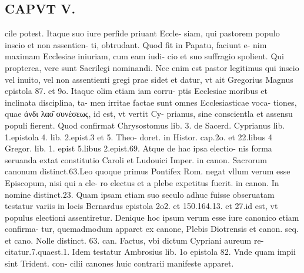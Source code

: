 \documentclass{article}
\begin{document}
\begin{pages}
\section*{CAPVT  V. }
\marginpar{[ p.35  ]}\pstart cile potest. Itaque suo iure perfide priuant Eccle- siam, qui pastorem populo inscio et non assentien- ti, obtrudant. Quod fit in Papatu, faciunt e- nim maximam Ecclesiae iniuriam, cum eam iudi- cio et suo suffragio spolient. Qui propterea, vere sunt Sacrilegi nominandi. Nec enim est pastor legitimus qui inscio vel inuito, vel non assentienti gregi prae sidet et datur, vt ait Gregorius Magnus epistola 87. et 9o. Itaque olim etiam iam corru- ptis Ecclesiae moribus et inclinata disciplina, ta- men irritae factae sunt omnes Ecclesiasticae voca- tiones, quae ἀνδι λαο͂ συνέσεως, id est, vt vertit Cy- prianus, sine conscientla et assensu populi fierent. Quod confirmat Chrysostomus lib. 3. de Sacerd. Cyprianus lib. 1.epistola 4. lib. 2.epist.3 et 5. Theo- doret. in Histor. cap.2o. et 22.libus 4 Gregor. lib. 1. epist 5.libus 2.epist.69. Atque de hac ipsa electio- nis forma seruanda extat constitutio Caroli et Ludouici Imper. in canon. Sacrorum canonum distinct.63.Leo quoque primus Pontifex Rom. negat vllum verum esse Episcopum, nisi qui a cle- ro electus et a plebe expetitus fuerit. in canon. In nomine distinct.23. Quam ipsam etiam suo seculo adhuc fuisse obseruatam testatur variis in locis Bernardus epistola 2o2. et 150.164.13. et 27.id est, vt populus electioni assentiretur. Denique hoc ipsum verum esse iure canonico etiam confirma- tur, quemadmodum apparet ex canone, Plebis Diotrensis et canon. seq. et cano. Nolle distinct. 63. can. Factus, vbi dictum Cypriani aureum re- citatur.7.quaest.1. Idem testatur Ambrosius lib. 1o epistola 82. Vnde quam impii sint Trident. con- cilii canones huic contrarii manifeste apparet.  \pend

\end{pages}
\end{document}
